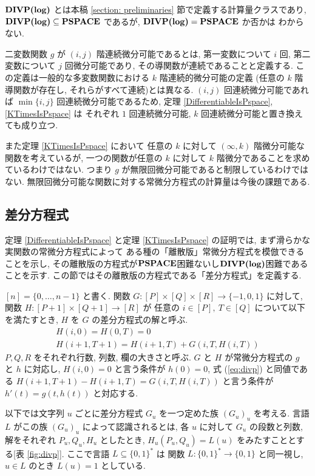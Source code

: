  $\text{\bf DIVP(log)}$ とは本稿 \ref{section: preliminaries} 節で定義する計算量クラスであり,
 $\text{\bf DIVP(log)} \subseteq {\bf PSPACE}$ であるが, $\text{\bf DIVP(log)} = {\bf PSPACE}$ か否かは
 わからない. 

 二変数関数 $g$ が $(i, j)$ 階連続微分可能であるとは,
 第一変数について $i$ 回, 第二変数について $j$ 回微分可能であり,
 その導関数が連続であることと定義する.
 この定義は一般的な多変数関数における $k$ 階連続的微分可能の定義
 (任意の $k$ 階導関数が存在し, それらがすべて連続)とは異なる.
 $(i,j)$ 回連続微分可能であれば $\min \{i, j\}$ 回連続微分可能であるため,
 定理 \ref{DifferentiableIsPspace}, \ref{KTimesIsPspace} は
 それぞれ $1$ 回連続微分可能, $k$ 回連続微分可能と置き換えても成り立つ.

 また定理 \ref{KTimesIsPspace} において
 任意の $k$ に対して $(\infty, k)$ 階微分可能な関数を考えているが,
 一つの関数が任意の $k$ に対して $k$ 階微分であることを求めているわけではない.
 つまり $g$ が無限回微分可能であると制限しているわけではない. 
 無限回微分可能な関数に対する常微分方程式の計算量は今後の課題である.





\subsection{差分方程式}
\label{section:divp}

定理 \ref{DifferentiableIsPspace} と定理 \ref{KTimesIsPspace} の証明では,
まず滑らかな実関数の常微分方程式によって
ある種の「離散版」常微分方程式を模倣できることを示し, 
その離散版の方程式が${\bf PSPACE}$困難ないし$\text{\bf DIVP(log)}$困難であることを示す.
この節ではその離散版の方程式である「差分方程式」を定義する.

$[n] = \{0, \dots , n-1\}$ と書く.
関数 $G \colon [P] \times [Q] \times [R] \to \{-1, 0, 1\}$ に対して,
関数 $H \colon [P + 1] \times [Q+1] \to [R]$ が
任意の $i \in [P],\ T \in [Q]$ について以下を満たすとき,
$H$ を $G$ の差分方程式の解と呼ぶ.
\begin{gather}
   H(i, 0) = H(0, T) = 0 
\\
   H(i + 1, T + 1) = H(i+1, T) + G(i, T, H(i, T))  \label{eq:divp}
\end{gather}
$P, Q, R$ をそれぞれ行数, 列数, 欄の大きさと呼ぶ.
$G$ と $H$ が常微分方程式の $g$ と $h$ に対応し,
$H(i, 0) = 0$ と言う条件が $h(0) = 0$,
式 (\ref{eq:divp}) と同値である $H(i + 1, T + 1) - H(i+1, T) = G(i, T, H(i, T))$
と言う条件が $h'(t) = g(t, h(t))$ と対応する.

以下では文字列 $u$ ごとに差分方程式 $G _u$ を一つ定めた族 $(G _u) _u$ を考える. 
 言語 $L$ がこの族 $(G_u)_u$ によって認識されるとは,
 各 $u$ に対して $G_u$ の段数と列数, 解をそれぞれ $P_u, Q_u, H_u$ としたとき,
 $H_u(P_u, Q_u) = L(u)$ をみたすこととする[表 \ref{fig:divp}].
ここで言語 $L \subseteq \{0, 1\} ^*$ は
関数 $L \colon \{0, 1\} ^* \to \{0, 1\}$ と同一視し, 
$u \in L$ のとき $L (u) = 1$ としている. 

